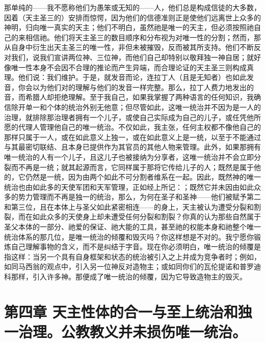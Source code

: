 那单纯的——我不愿称他们为愚笨或无知的——人，他们总是构成信徒的大多数，因着（天主圣三的）安排而惊愕，因为他们的信德准则正是使他们远离世上众多的神明，归向唯一真实的天主；他们不明白，虽然祂是唯一的天主，但必须按照祂自己的来相信祂。他们将天主圣三的数目顺序和分布视为对唯一性的分割；然而，那从自身中衍生出天主圣三的唯一性，非但未被摧毁，反而被其所支持。他们不断反对我们，说我们宣讲两位神、三位神，而他们自己却特别以敬拜独一神自居；就好像唯一性本身不会因不合理的推论而产生异端，而合理论证的天主圣三则构成真理。他们说：我们维护。于是，就发音而论，连拉丁人（且是无知者）也如此发音，你会以为他们对的理解与他们的发音一样完整。那么，拉丁人费力地发出的音，而希腊人却拒绝理解。至于我自己，如果我掌握了两种语言的任何知识，我确信除开单一和个体的统治外别无他意；但尽管如此，这唯一统治并不因为是一人的治理，就排除那治理者拥有一个儿子，或使自己实际成为自己的儿子，或任凭他所愿的代理人管理他自己的唯一统治。不仅如此，我主张，任何主权都不像他自己的那样只属于一人，或在如此意义上独一，或在如此意义上是一统，以至于不能通过与其最密切联结、且本身已提供作为其官员的其他人物来管理。此外，如果那拥有唯一统治的人有一个儿子，且这儿子也被接纳为分享者，这唯一统治并不会立即分裂而不再是一统；就其起源而言，它同样属于那将它传给儿子的人；既然是属于他的，它仍然是一统，因为由两个如此不可分割者维系在一起。因此，既然神的唯一统治也由如此多的天使军团和天军管理，正如经上所记：；既然它并未因由如此众多的势力管理而不再是独一的统治，那么，为何在圣子和圣神——他们被赋予第二和第三位，且在本体上与圣父如此紧密相连——的身上，天主被认为遭受分裂和割裂，而在如此众多的天使身上却未遭受任何分裂和割裂？你真的认为那些自然属于圣父本体的一部分、祂爱的保证、祂大能的工具，甚至祂的权能本身和祂整个唯一统治体系的那几位，是唯一统治的倾覆和毁灭吗？你这样想是不对的。我宁愿你锻炼自己理解事物的含义，而不是纠结于字音。现在你必须明白，唯一统治的倾覆是指这样：当另一个具有自身框架和状态的统治被引入之上并成为竞争者时；例如，如同马西翁的观点中，引入另一位神反对造物主；或如同你们的瓦伦提诺和普罗迪科那样，引入许多神。那便成了唯一统治的倾覆，因为它导致造物主的毁灭。\par


\section{第四章 天主性体的合一与至上统治和独一治理。公教教义并未损伤唯一统治。}

